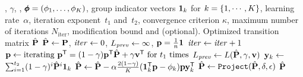 \documentclass[sigconf, anonymous, review]{acmart}
\begin{document}

\begin{algorithm}[t]
  \caption{\label{alg:fairgd}\fairgd: Projected gradient descent for \phiPageRank and \resphiPageRank}
  \begin{algorithmic}[1]
    \REQUIRE \transmatrix, $\gamma$, \vectv, 
$\pmb{\phi} =(\phi_1, \ldots, \phi_K)$, group indicator vectors $\mathbf{{1}}_{k}$ for $k = \{1, \cdots, K\}$, learning rate~$\alpha$, iteration exponent~$t_1$ and~$t_2$, convergence criterion $\kappa$, maximum number of iterations $N_{\text{iter}}$, modification bound \boundfactor and \absboundfactor (optional).
    \ENSURE Optimized transition matrix $\hat{\mathbf{{P}}}$
    \STATE $\hat{\mathbf{{P}}} \gets \mathbf{{P}}$, ${{\mathit{iter}}} \gets 0$, ${L_{\mathit{prev}}} \gets \infty$, $\mathbf{{p}} = \frac{1}{n} \mathbf{{1}}_{}$
      \STATE ${\mathit{iter}} \gets {\mathit{iter}} + 1$
      \STATE $\mathbf{{p}} \gets \text{iterating } \mathbf{{p}}^{\mathsf{T}} = (1 - \gamma) \mathbf{{p}}^{\mathsf{T}} \hat{\mathbf{{P}}} + \gamma \mathbf{{v}}^{\mathsf{T}} \text{ for } t_1 \text{ times}$
      \STATE ${L_{\mathit{prev}}} \gets L(\hat{\mathbf{{P}}}, \gamma, \mathbf{{v}})$
        \STATE $\mathbf{{y}}_{k} \gets$ $\sum_{i=1}^{t_2} (1-\gamma)^i \hat{\mathbf{{P}}}^i \mathbf{{1}}_{k}$
          \STATE $\hat{\mathbf{{P}}} \gets \hat{\mathbf{{P}}} - \alpha \frac{2(1 - \gamma)}{K} (\mathbf{{1}}_{k}^{\mathsf{T}} \mathbf{{p}} - \phi_k) \mathbf{{p}} \mathbf{{y}}_k^{\mathsf{T}}$
        \ENDFOR
        \STATE $\hat{\mathbf{{P}}} \gets {{\texttt{Project}}}(\hat{\mathbf{{P}}}, \delta, \epsilon)$
    \ENDWHILE
    \RETURN $\hat{\mathbf{{P}}}$
  \end{algorithmic}
\end{algorithm}
\end{document}

